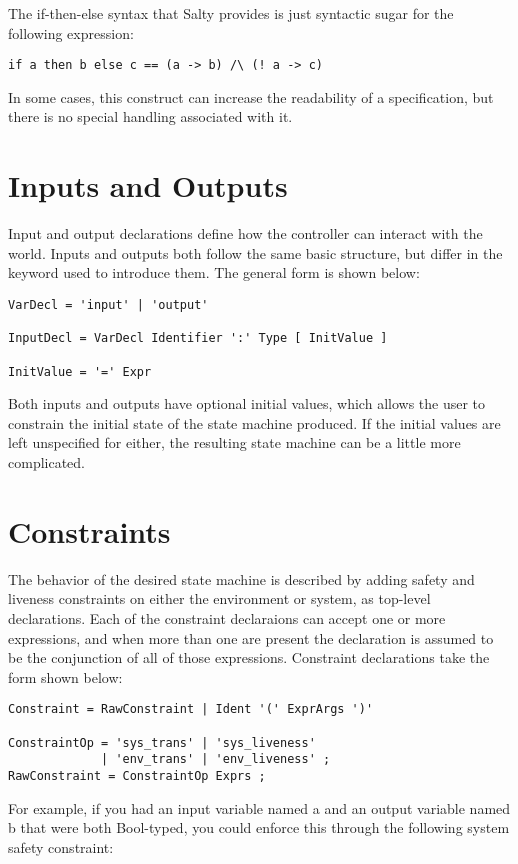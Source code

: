The if-then-else syntax that Salty provides is just syntactic sugar for the following expression:
\begin{lstlisting}
if a then b else c == (a -> b) /\ (! a -> c)
\end{lstlisting}
In some cases, this construct can increase the readability of a specification, but there is no special handling associated with it.

\section{Inputs and Outputs}

Input and output declarations define how the controller can interact with the world. Inputs and outputs both follow the same basic structure, but differ in the keyword used to introduce them. The general form is shown below:
\begin{lstlisting}
VarDecl = 'input' | 'output'

InputDecl = VarDecl Identifier ':' Type [ InitValue ]

InitValue = '=' Expr
\end{lstlisting}
Both inputs and outputs have optional initial values, which allows the user to constrain the initial state of the state machine produced. If the initial values are left unspecified for either, the resulting state machine can be a little more complicated.

\section{Constraints}

The behavior of the desired state machine is described by adding safety and liveness constraints on either the environment or system, as top-level declarations. Each of the constraint declaraions can accept one or more expressions, and when more than one are present the declaration is assumed to be the conjunction of all of those expressions. Constraint declarations take the form shown below:
\begin{lstlisting}
Constraint = RawConstraint | Ident '(' ExprArgs ')'

ConstraintOp = 'sys_trans' | 'sys_liveness'
             | 'env_trans' | 'env_liveness' ;
RawConstraint = ConstraintOp Exprs ;
\end{lstlisting}

For example, if you had an input variable named a and an output variable named b that were both Bool-typed, you could enforce this through the following system safety constraint:

